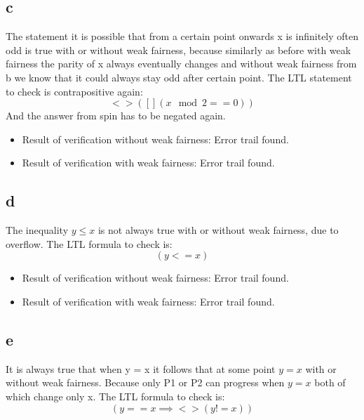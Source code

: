 \documentclass{article}
\begin{document}
\subsection*{c}

The statement it is possible that from a certain point onwards x is infinitely often odd is true with or without weak fairness, because similarly as before with weak fairness the parity of x always eventually changes and without weak fairness from b we know that it could always stay odd after certain point. The LTL statement to check is contrapositive again:
\begin{equation}
<>([] (x \mod 2 == 0))
\end{equation}
And the answer from spin has to be negated again.

\begin{itemize}
\item Result of verification without weak fairness: Error trail found.
\item Result of verification with weak fairness: Error trail found.
\end{itemize}

\subsection*{d}

The inequality $y \leq x$ is not always true with or without weak fairness, due to overflow. The LTL formula to check is:
\begin{equation}
[](y <= x)
\end{equation}

\begin{itemize}
\item Result of verification without weak fairness: Error trail found.
\item Result of verification with weak fairness: Error trail found.
\end{itemize}

\subsection*{e}

It is always true that when y = x it follows that at some point $y = x$ with or without weak fairness. Because only P1 or P2 can progress when $y = x$ both of which change only x. The LTL formula to check is:
\begin{equation}
[] (y == x \implies <>(y != x))
\end{equation}
\end{document}
